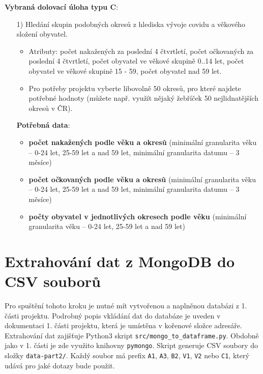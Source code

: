 \documentclass[12pt]{article}
\begin{document}
\hspace{1cm}

\textbf{Vybraná dolovací úloha typu C}:
\begin{itemize}
    \item[1)] Hledání skupin podobných okresů z hlediska vývoje covidu a věkového složení obyvatel.
    \begin{itemize}
        \item Atributy: počet nakažených za poslední 4 čtvrtletí, počet očkovaných za poslední 4 čtvrtletí, počet obyvatel ve věkové skupině 0..14 let, počet obyvatel ve věkové skupině 15 - 59, počet obyvatel nad 59 let.
        \item Pro potřeby projektu vyberte libovolně 50 okresů, pro které najdete potřebné hodnoty (můžete např. využít nějaký žebříček 50 nejlidnatějších okresů v ČR).
    \end{itemize}

    \item[] \textbf{Potřebná data}:
    \begin{itemize}
        \item \textbf{počet nakažených podle věku a okresů} (minimální granularita věku -- 0-24 let, 25-59 let a nad 59 let, minimální granularita datumu -- 3 měsíce)
        \item \textbf{počet očkovaných podle věku a okresů} (minimální granularita věku -- 0-24 let, 25-59 let a nad 59 let, minimální granularita datumu -- 3 měsíce)
        \item \textbf{počty obyvatel v jednotlivých okresech podle věku} (minimální granularita věku -- 0-24 let, 25-59 let a nad 59 let)
    \end{itemize}
\end{itemize}

\newpage
\section{Extrahování dat z MongoDB do CSV souborů}
Pro spuštění tohoto kroku je nutné mít vytvořenou a naplněnou databázi z 1. části projektu. Podrobný popis vkládání dat do databáze je uveden v dokumentaci 1. části projektu, která je umístěna v kořenové složce adresáře. Extrahování dat zajišťuje Python3 skript \texttt{src/mongo\_to\_dataframe.py}. Obdobně jako v 1. části je zde využito knihovny \texttt{pymongo}. Skript generuje CSV soubory do složky \texttt{data-part2/}. Každý soubor má prefix \texttt{A1}, \texttt{A3}, \texttt{B2}, \texttt{V1}, \texttt{V2} nebo \texttt{C1}, který udává pro jaké dotazy bude použit.
\end{document}
